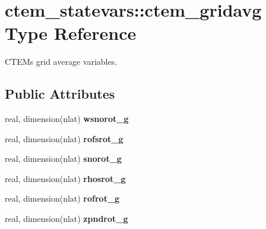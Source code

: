 \hypertarget{structctem__statevars_1_1ctem__gridavg}{}\section{ctem\+\_\+statevars\+:\+:ctem\+\_\+gridavg Type Reference}
\label{structctem__statevars_1_1ctem__gridavg}


C\+T\+E\+M\textquotesingle{}s grid average variables.  


\subsection*{Public Attributes}
\begin{DoxyCompactItemize}
\item 
\hypertarget{structctem__statevars_1_1ctem__gridavg_ab6fe883a37f5822a9797c31c77fa26d8}{}real, dimension(nlat) {\bfseries wsnorot\+\_\+g}\label{structctem__statevars_1_1ctem__gridavg_ab6fe883a37f5822a9797c31c77fa26d8}

\item 
\hypertarget{structctem__statevars_1_1ctem__gridavg_adc449dbc4cbd21954c670aa19d2385ac}{}real, dimension(nlat) {\bfseries rofsrot\+\_\+g}\label{structctem__statevars_1_1ctem__gridavg_adc449dbc4cbd21954c670aa19d2385ac}

\item 
\hypertarget{structctem__statevars_1_1ctem__gridavg_ac408334745ebb54127d93a684608effa}{}real, dimension(nlat) {\bfseries snorot\+\_\+g}\label{structctem__statevars_1_1ctem__gridavg_ac408334745ebb54127d93a684608effa}

\item 
\hypertarget{structctem__statevars_1_1ctem__gridavg_a208fcecf0c54d6661e9f03591549c271}{}real, dimension(nlat) {\bfseries rhosrot\+\_\+g}\label{structctem__statevars_1_1ctem__gridavg_a208fcecf0c54d6661e9f03591549c271}

\item 
\hypertarget{structctem__statevars_1_1ctem__gridavg_a0e9422f9c3c1a93e51cae2bc466f5cdf}{}real, dimension(nlat) {\bfseries rofrot\+\_\+g}\label{structctem__statevars_1_1ctem__gridavg_a0e9422f9c3c1a93e51cae2bc466f5cdf}

\item 
\hypertarget{structctem__statevars_1_1ctem__gridavg_a4944cfd34f806760954e8a4f39309cdf}{}real, dimension(nlat) {\bfseries zpndrot\+\_\+g}\label{structctem__statevars_1_1ctem__gridavg_a4944cfd34f806760954e8a4f39309cdf}


\end{DoxyCompactItemize}
